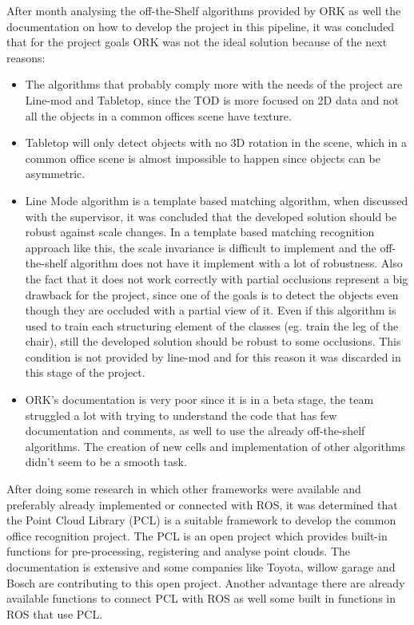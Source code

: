 \documentclass[fontsize=12pt]{article}
\begin{document}
After  month analysing the off-the-Shelf algorithms provided by ORK as well the documentation on how to develop the project in this pipeline, it was concluded that for the project goals ORK was not the ideal solution because of the next reasons:
\begin{itemize}
\item The algorithms that probably comply more with the needs of the project are Line-mod and Tabletop, since the TOD is more focused on 2D data and not all the objects in a common offices scene have texture.
\item Tabletop will only detect objects with no 3D rotation in the scene, which  in a common office scene is almost impossible to happen since objects can be asymmetric.
\item Line Mode algorithm is a template based matching algorithm, when discussed with the supervisor, it was concluded that the developed solution should be robust against scale changes. In a template based matching recognition approach like this, the scale invariance is difficult to implement and the off-the-shelf algorithm does not have it implement with a lot of robustness. Also the fact that it does not work correctly with partial occlusions represent a big drawback for the project, since one of the goals is to detect the objects even though they are occluded with a partial view of it. Even if this algorithm is used to train each structuring element of the classes (eg. train the leg of the chair), still the developed solution should be robust to some occlusions. This condition is not provided by line-mod and for this reason it was discarded in this stage of the project. 
\item ORK's documentation is very poor since it is in a beta stage, the team struggled a lot with trying to understand the code that has few documentation and comments, as well to use the already off-the-shelf algorithms. The creation of new cells and implementation of other algorithms didn't seem to be a smooth task.  
\end{itemize} 
After doing some research in which other frameworks were available and preferably already implemented or connected with ROS, it was  determined that the Point Cloud Library (PCL) \cite{bib:pcl} is a suitable framework to develop the common office recognition project.
The PCL is an open project which provides built-in functions for pre-processing, registering and analyse point clouds. The documentation is extensive and some companies like Toyota, willow garage and Bosch are contributing to this open project. Another advantage there are already available functions to connect PCL with ROS as well some built in functions in ROS that use PCL. \\
\end{document}
